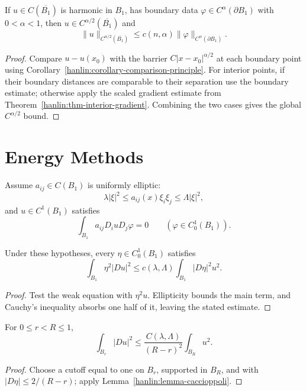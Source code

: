 \begin{lemma}\label{hanlin:lemma-holder-boundary}
If $u\in C(\overline{B_1})$ is harmonic in $B_1$, has boundary data
$\varphi\in C^\alpha(\partial B_1)$ with $0<\alpha<1$, then
$u\in C^{\alpha/2}(\overline{B_1})$ and
\[
\|u\|_{C^{\alpha/2}(\overline{B_1})}\le c(n,\alpha)\|\varphi\|_{C^\alpha(\partial B_1)}.
\]
\end{lemma}
\begin{proof}
\sketch Compare $u-u(x_0)$ with the barrier
$C|x-x_0|^{\alpha/2}$ at each boundary point using Corollary~\ref{hanlin:corollary-comparison-principle}.
For interior points, if their boundary distances are comparable to their
separation use the boundary estimate; otherwise apply the scaled gradient
estimate from Theorem~\ref{hanlin:thm-interior-gradient}. Combining the two cases
gives the global $C^{\alpha/2}$ bound.
\end{proof}

\section{Energy Methods}

Assume $a_{ij}\in C(B_1)$ is uniformly elliptic:
\[
\lambda|\xi|^2\le a_{ij}(x)\xi_i\xi_j\le\Lambda|\xi|^2,
\]
and $u\in C^1(B_1)$ satisfies
\[
\int_{B_1}a_{ij}D_i uD_j\varphi=0\qquad(\varphi\in C_0^1(B_1)).
\]

\begin{lemma}\label{hanlin:lemma-caccioppoli}
Under these hypotheses, every $\eta\in C_0^1(B_1)$ satisfies
\[
\int_{B_1}\eta^2|Du|^2\le c(\lambda,\Lambda)\int_{B_1}|D\eta|^2u^2.
\]
\end{lemma}
\begin{proof}
\sketch Test the weak equation with $\eta^2u$. Ellipticity bounds the main term,
and Cauchy's inequality absorbs one half of it, leaving the stated estimate.
\end{proof}

\begin{corollary}\label{hanlin:cor-caccioppoli-balls}
For $0\le r<R\le1$,
\[
\int_{B_r}|Du|^2\le\frac{C(\lambda,\Lambda)}{(R-r)^2}\int_{B_R}u^2.
\]
\end{corollary}
\begin{proof}
\sketch Choose a cutoff equal to one on $B_r$, supported in $B_R$, and with
$|D\eta|\le2/(R-r)$; apply Lemma~\ref{hanlin:lemma-caccioppoli}.
\end{proof}

